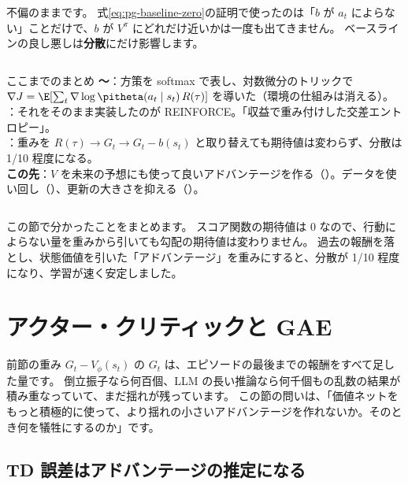 不偏のままです。
式\eqref{eq:pg-baseline-zero}の証明で使ったのは「$b$ が $a_t$ によらない」ことだけで、$b$ が $V^{\pi}$ にどれだけ近いかは一度も出てきません。
ベースラインの良し悪しは\textbf{分散}にだけ影響します。

\begin{column}{ここまでのまとめ}
\textbf{〜}：方策を softmax で表し、対数微分のトリックで $\nabla J=\E[\sum_t\nabla\log\pitheta(a_t\mid s_t)\,R(\tau)]$ を導いた（環境の仕組みは消える）。\\
\textbf{}：それをそのまま実装したのが REINFORCE。「収益で重み付けした交差エントロピー」。\\
\textbf{}：重みを $R(\tau)\to G_t\to G_t-b(s_t)$ と取り替えても期待値は変わらず、分散は 1/10 程度になる。\\
\textbf{この先}：$V$ を未来の予想にも使って良いアドバンテージを作る（）。データを使い回し（）、更新の大きさを抑える（）。
\end{column}

この節で分かったことをまとめます。
スコア関数の期待値は 0 なので、行動によらない量を重みから引いても勾配の期待値は変わりません。
過去の報酬を落とし、状態価値を引いた「アドバンテージ」を重みにすると、分散が 1/10 程度になり、学習が速く安定しました。

\section{アクター・クリティックと GAE}\label{sec:pg-actor-critic}

前節の重み $G_t-V_\phi(s_t)$ の $G_t$ は、エピソードの最後までの報酬をすべて足した量です。
倒立振子なら何百個、LLM の長い推論なら何千個もの乱数の結果が積み重なっていて、まだ揺れが残っています。
この節の問いは、「価値ネットをもっと積極的に使って、より揺れの小さいアドバンテージを作れないか。そのとき何を犠牲にするのか」です。

\subsection*{TD 誤差はアドバンテージの推定になる}

